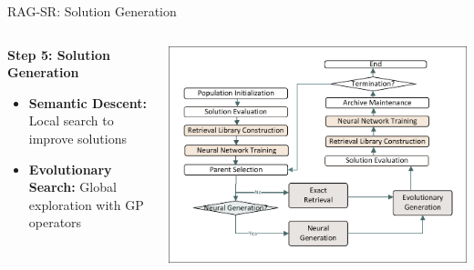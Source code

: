 \documentclass[aspectratio=1610]{beamer}
\begin{document}
    \begin{frame}{RAG-SR: Solution Generation}
        \begin{columns}
            \begin{column}{0.5\textwidth}
                \textbf{Step 5: Solution Generation}
                \begin{itemize}
                    \item \textbf{Semantic Descent:} Local search to improve solutions
                    \item \textbf{Evolutionary Search:} Global exploration with GP operators
                \end{itemize}
            \end{column}
            \begin{column}{0.5\textwidth}
                \includegraphics[width=1.0\textwidth]{figs/Workflow.pdf}
            \end{column}
        \end{columns}
    \end{frame}
\end{document}
